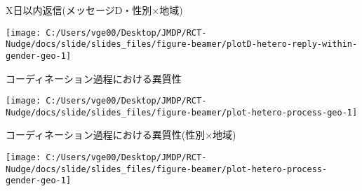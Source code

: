 \documentclass[
      aspectratio=169,
        12pt,
    ]{beamer}
\begin{document}
\begin{frame}{X日以内返信(メッセージD・性別×地域)}
\protect\hypertarget{xux65e5ux4ee5ux5185ux8fd4ux4fe1ux30e1ux30c3ux30bbux30fcux30b8dux6027ux5225ux5730ux57df}{}
\begin{center}\texttt{[image: C:/Users/vge00/Desktop/JMDP/RCT-Nudge/docs/slide/slides\_files/figure-beamer/plotD-hetero-reply-within-gender-geo-1]} \end{center}
\end{frame}

\begin{frame}{コーディネーション過程における異質性}
\protect\hypertarget{ux30b3ux30fcux30c7ux30a3ux30cdux30fcux30b7ux30e7ux30f3ux904eux7a0bux306bux304aux3051ux308bux7570ux8ceaux6027}{}
\begin{center}\texttt{[image: C:/Users/vge00/Desktop/JMDP/RCT-Nudge/docs/slide/slides\_files/figure-beamer/plot-hetero-process-geo-1]} \end{center}
\end{frame}

\begin{frame}{コーディネーション過程における異質性(性別×地域)}
\protect\hypertarget{ux30b3ux30fcux30c7ux30a3ux30cdux30fcux30b7ux30e7ux30f3ux904eux7a0bux306bux304aux3051ux308bux7570ux8ceaux6027ux6027ux5225ux5730ux57df}{}
\begin{center}\texttt{[image: C:/Users/vge00/Desktop/JMDP/RCT-Nudge/docs/slide/slides\_files/figure-beamer/plot-hetero-process-gender-geo-1]} \end{center}
\end{frame}
\end{document}
